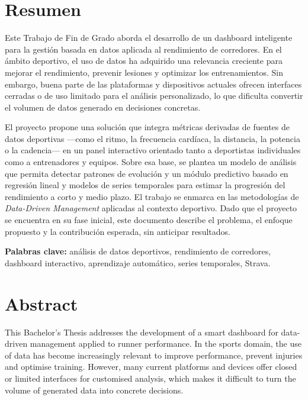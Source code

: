 
\chapter*{Resumen}

Este Trabajo de Fin de Grado aborda el desarrollo de un dashboard inteligente
para la gestión basada en datos aplicada al rendimiento de corredores. En el
ámbito deportivo, el uso de datos ha adquirido una relevancia creciente para
mejorar el rendimiento, prevenir lesiones y optimizar los entrenamientos. Sin
embargo, buena parte de las plataformas y dispositivos actuales ofrecen
interfaces cerradas o de uso limitado para el análisis personalizado, lo que
dificulta convertir el volumen de datos generado en decisiones concretas.

El proyecto propone una solución que integra métricas derivadas de fuentes de
datos deportivas ---como el ritmo, la frecuencia cardíaca, la distancia, la
potencia o la cadencia--- en un panel interactivo orientado tanto a deportistas
individuales como a entrenadores y equipos. Sobre esa base, se plantea un modelo
de análisis que permita detectar patrones de evolución y un módulo predictivo
basado en regresión lineal y modelos de series temporales para estimar la
progresión del rendimiento a corto y medio plazo. El trabajo se enmarca en las
metodologías de \emph{Data-Driven Management} aplicadas al contexto deportivo.
Dado que el proyecto se encuentra en su fase inicial, este documento describe el
problema, el enfoque propuesto y la contribución esperada, sin anticipar
resultados.

\vspace{0.5\baselineskip}
\noindent\textbf{Palabras clave:} análisis de datos deportivos, rendimiento de
corredores, dashboard interactivo, aprendizaje automático, series temporales,
Strava.

\chapter*{Abstract}

This Bachelor's Thesis addresses the development of a smart dashboard for
data-driven management applied to runner performance. In the sports domain, the
use of data has become increasingly relevant to improve performance, prevent
injuries and optimise training. However, many current platforms and devices
offer closed or limited interfaces for customised analysis, which makes it
difficult to turn the volume of generated data into concrete decisions.

